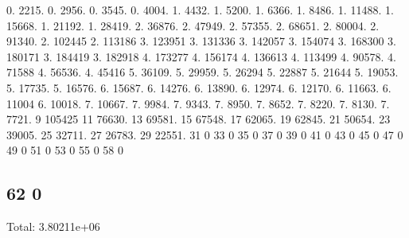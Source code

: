 0. 2215. 0. 2956. 0. 3545. 0. 4004. 1. 4432. 1. 5200. 1. 6366. 1. 8486. 1. 11488. 1. 15668. 1. 21192. 1. 28419. 2. 36876. 2. 47949. 2. 57355. 2. 68651. 2. 80004. 2. 91340. 2. 102445 2. 113186 3. 123951 3. 131336 3. 142057 3. 154074 3. 168300 3. 180171 3. 184419 3. 182918 4. 173277 4. 156174 4. 136613 4. 113499 4. 90578. 4. 71588 4. 56536. 4. 45416 5. 36109. 5. 29959. 5. 26294 5. 22887 5. 21644 5. 19053. 5. 17735. 5. 16576. 6. 15687. 6. 14276. 6. 13890. 6. 12974. 6. 12170. 6. 11663. 6. 11004 6. 10018. 7. 10667. 7. 9984. 7. 9343. 7. 8950. 7. 8652. 7. 8220. 7. 8130. 7. 7721. 9 105425 11 76630. 13 69581. 15 67548. 17 62065. 19 62845. 21 50654. 23 39005. 25 32711. 27 26783. 29 22551. 31 0 33 0 35 0 37 0 39 0 41 0 43 0 45 0 47 0 49 0 51 0 53 0 55 0 58 0 \subsection*{62 0 }

Total\+: 3.\+80211e+06 